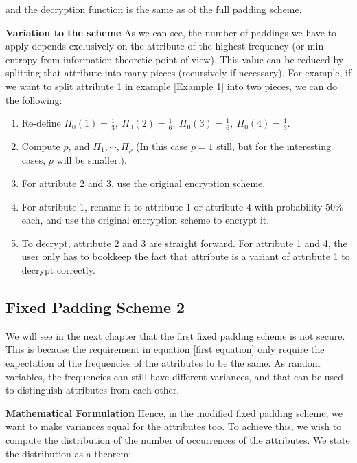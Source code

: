 \documentclass[10pt]{book}
\begin{document}
and the decryption function is the same as of the full padding scheme.


\textbf{Variation to the scheme} As we can see, the number of paddings we have to apply depends exclusively on the attribute of the highest frequency (or min-entropy from information-theoretic point of view). This value can be reduced by splitting that attribute into many pieces (recursively if necessary). For example, if we want to split attribute 1 in example \ref{Example 1} into two pieces, we can do the following:
\begin{enumerate}
\item Re-define $\Pi_0(1) = \frac{1}{3}, \ \Pi_0(2) = \frac{1}{6}, \ \Pi_0(3) = \frac{1}{6}, \ \Pi_0(4) = \frac{1}{3}$.
\item Compute $p$, and $\Pi_1, \cdots, \Pi_p$ (In this case $p = 1$ still, but for the interesting cases, $p$ will be smaller.).
\item For attribute 2 and 3, use the original encryption scheme.
\item For attribute 1, rename it to attribute 1 or attribute 4 with probability 50\% each, and use the original encryption scheme to encrypt it.
\item To decrypt, attribute 2 and 3 are straight forward. For attribute 1 and 4, the user only has to bookkeep the fact that attribute is a variant of attribute 1 to decrypt correctly.
\end{enumerate}


\subsection{Fixed Padding Scheme 2}
We will see in the next chapter that the first fixed padding scheme is not secure. This is because the requirement in equation \ref{first equation} only require the expectation of the frequencies of the attributes to be the same. As random variables, the frequencies can still have different variances, and that can be used to distinguish attributes from each other.


\textbf{Mathematical Formulation} Hence, in the modified fixed padding scheme, we want to make variances equal for the attributes too. To achieve this, we wish to compute the distribution of the number of occurrences of the attributes. We state the distribution as a theorem:
\end{document}
